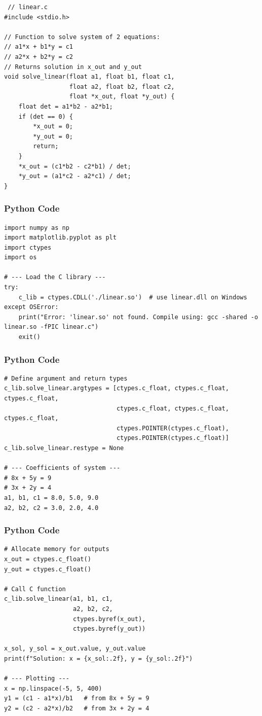 \documentclass{beamer}
\begin{document}
\begin{frame}[fragile]
    \begin{lstlisting}
 // linear.c
#include <stdio.h>

// Function to solve system of 2 equations:
// a1*x + b1*y = c1
// a2*x + b2*y = c2
// Returns solution in x_out and y_out
void solve_linear(float a1, float b1, float c1,
                  float a2, float b2, float c2,
                  float *x_out, float *y_out) {
    float det = a1*b2 - a2*b1;
    if (det == 0) {
        *x_out = 0;
        *y_out = 0;
        return;
    }
    *x_out = (c1*b2 - c2*b1) / det;
    *y_out = (a1*c2 - a2*c1) / det;
}
     \end{lstlisting}
\end{frame}

\begin{frame}[fragile]
    \frametitle{Python Code}
    \begin{lstlisting}
import numpy as np
import matplotlib.pyplot as plt
import ctypes
import os

# --- Load the C library ---
try:
    c_lib = ctypes.CDLL('./linear.so')  # use linear.dll on Windows
except OSError:
    print("Error: 'linear.so' not found. Compile using: gcc -shared -o linear.so -fPIC linear.c")
    exit()
    \end{lstlisting}
\end{frame}

\begin{frame}[fragile]
    \frametitle{Python Code}
    \begin{lstlisting}
# Define argument and return types
c_lib.solve_linear.argtypes = [ctypes.c_float, ctypes.c_float, ctypes.c_float,
                               ctypes.c_float, ctypes.c_float, ctypes.c_float,
                               ctypes.POINTER(ctypes.c_float),
                               ctypes.POINTER(ctypes.c_float)]
c_lib.solve_linear.restype = None

# --- Coefficients of system ---
# 8x + 5y = 9
# 3x + 2y = 4
a1, b1, c1 = 8.0, 5.0, 9.0
a2, b2, c2 = 3.0, 2.0, 4.0
    \end{lstlisting}
\end{frame}

\begin{frame}[fragile]
    \frametitle{Python Code}
    \begin{lstlisting}
# Allocate memory for outputs
x_out = ctypes.c_float()
y_out = ctypes.c_float()

# Call C function
c_lib.solve_linear(a1, b1, c1,
                   a2, b2, c2,
                   ctypes.byref(x_out),
                   ctypes.byref(y_out))

x_sol, y_sol = x_out.value, y_out.value
print(f"Solution: x = {x_sol:.2f}, y = {y_sol:.2f}")

# --- Plotting ---
x = np.linspace(-5, 5, 400)
y1 = (c1 - a1*x)/b1   # from 8x + 5y = 9
y2 = (c2 - a2*x)/b2   # from 3x + 2y = 4
    \end{lstlisting}
\end{frame}
\end{document}
